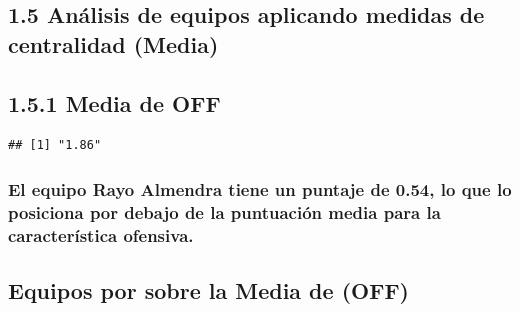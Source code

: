 \documentclass[]{article}
\newenvironment{Shaded}{\begin{snugshade}}{\end{snugshade}}
\newcommand{\KeywordTok}[1]{\textcolor[rgb]{0.13,0.29,0.53}{\textbf{#1}}}
\newcommand{\NormalTok}[1]{#1}
\newcommand{\OperatorTok}[1]{\textcolor[rgb]{0.81,0.36,0.00}{\textbf{#1}}}
\newcommand{\StringTok}[1]{\textcolor[rgb]{0.31,0.60,0.02}{#1}}
\begin{document}
\hypertarget{analisis-de-equipos-aplicando-medidas-de-centralidad-media}{%
\subsection{1.5 Análisis de equipos aplicando medidas de centralidad
(Media)}\label{analisis-de-equipos-aplicando-medidas-de-centralidad-media}}

\hypertarget{media-de-off}{%
\subsection{1.5.1 Media de OFF}\label{media-de-off}}

\begin{Shaded}
\end{Shaded}

\begin{verbatim}
## [1] "1.86"
\end{verbatim}

\hypertarget{el-equipo-rayo-almendra-tiene-un-puntaje-de-0.54-lo-que-lo-posiciona-por-debajo-de-la-puntuacion-media-para-la-caracteristica-ofensiva.}{%
\subsubsection{\texorpdfstring{El equipo Rayo Almendra tiene un puntaje
de \textbf{0.54}, lo que lo posiciona por debajo de la puntuación media
para la característica
ofensiva.}{El equipo Rayo Almendra tiene un puntaje de 0.54, lo que lo posiciona por debajo de la puntuación media para la característica ofensiva.}}\label{el-equipo-rayo-almendra-tiene-un-puntaje-de-0.54-lo-que-lo-posiciona-por-debajo-de-la-puntuacion-media-para-la-caracteristica-ofensiva.}}

\hypertarget{equipos-por-sobre-la-media-de-off}{%
\subsection{Equipos por sobre la Media de
(OFF)}\label{equipos-por-sobre-la-media-de-off}}
\end{document}
